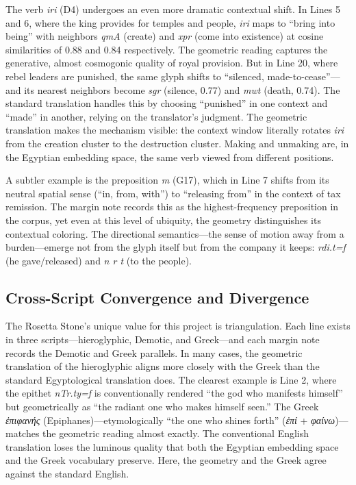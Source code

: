 \documentclass[11pt, a4paper]{article}
\newcommand{\gk}[1]{{\greekfont\itshape #1}}
\begin{document}
The verb \textit{iri} (D4) undergoes an even more dramatic contextual shift. In Lines 5 and 6, where the king provides for temples and people, \textit{iri} maps to ``bring into being'' with neighbors \textit{qmA} (create) and \textit{xpr} (come into existence) at cosine similarities of 0.88 and 0.84 respectively. The geometric reading captures the generative, almost cosmogonic quality of royal provision. But in Line 20, where rebel leaders are punished, the same glyph shifts to ``silenced, made-to-cease''---and its nearest neighbors become \textit{sgr} (silence, 0.77) and \textit{mwt} (death, 0.74). The standard translation handles this by choosing ``punished'' in one context and ``made'' in another, relying on the translator's judgment. The geometric translation makes the mechanism visible: the context window literally rotates \textit{iri} from the creation cluster to the destruction cluster. Making and unmaking are, in the Egyptian embedding space, the same verb viewed from different positions.

A subtler example is the preposition \textit{m} (G17), which in Line 7 shifts from its neutral spatial sense (``in, from, with'') to ``releasing from'' in the context of tax remission. The margin note records this as the highest-frequency preposition in the corpus, yet even at this level of ubiquity, the geometry distinguishes its contextual coloring. The directional semantics---the sense of motion away from a burden---emerge not from the glyph itself but from the company it keeps: \textit{rdi.t=f} (he gave/released) and \textit{n r t} (to the people).

\subsection{Cross-Script Convergence and Divergence}

The Rosetta Stone's unique value for this project is triangulation. Each line exists in three scripts---hieroglyphic, Demotic, and Greek---and each margin note records the Demotic and Greek parallels. In many cases, the geometric translation of the hieroglyphic aligns more closely with the Greek than the standard Egyptological translation does. The clearest example is Line 2, where the epithet \textit{nTr.ty=f} is conventionally rendered ``the god who manifests himself'' but geometrically as ``the radiant one who makes himself seen.'' The Greek \gk{ἐπιφανής} (Epiphanes)---etymologically ``the one who shines forth'' (\gk{ἐπί} + \gk{φαίνω})---matches the geometric reading almost exactly. The conventional English translation loses the luminous quality that both the Egyptian embedding space and the Greek vocabulary preserve. Here, the geometry and the Greek agree against the standard English.
\end{document}
